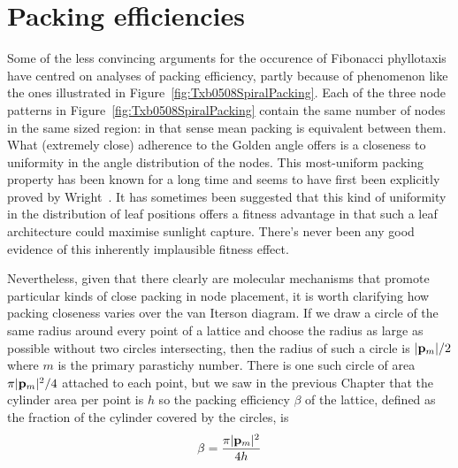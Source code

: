 \section{Packing efficiencies}
Some of the less convincing arguments for the occurence of Fibonacci phyllotaxis have centred on analyses of packing efficiency, partly because of phenomenon like the ones illustrated in Figure~\ref{fig:Txb0508SpiralPacking}.%
%
Each of the three node patterns in Figure~\ref{fig:Txb0508SpiralPacking} contain the same number of nodes in the same sized region: in that sense mean packing is equivalent between them. What (extremely close) adherence to the Golden angle offers is a closeness to uniformity in the angle distribution of the nodes. This most-uniform packing property has been known for a long time and seems to have first been explicitly proved by Wright~\cite{wrightMostThoroughUniform1859}. It has sometimes been suggested that this kind of uniformity in the distribution of leaf positions offers a fitness advantage in that such a leaf architecture could maximise sunlight capture. There's never been any good evidence of this inherently implausible fitness effect.

Nevertheless, given that there clearly are molecular mechanisms that promote particular kinds of close packing in node placement, it is worth clarifying how packing closeness varies over the van Iterson diagram.  If we  draw a circle of the same radius around every point of a lattice and choose the radius as large as possible without two circles intersecting, then the radius of such a circle is $|{\mathbf p}_{m}|/2$ where $m$ is the primary parastichy number. There is one such circle of area $ {\pi |{\mathbf p}_{m}|^2 }/{4}$ attached to each point, but we saw in the previous Chapter that the cylinder area per point is $h$ so  the packing efficiency $\beta$ of the lattice, defined as the fraction of the cylinder covered by the circles, is
\[
\beta = \frac{ \pi |{\mathbf p}_{m}|^2 }{4 h}
\]


